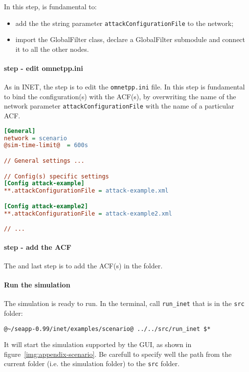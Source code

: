 In this step, is fundamental to:
%
\begin{itemize}
\item add the the string parameter \texttt{attackConfigurationFile} to the network;
\item import the GlobalFilter class, declare a GlobalFilter submodule and connect it to all the other nodes.
\end{itemize}

\paragraph{ step - edit omnetpp.ini}
As in INET, the  step is to edit the \texttt{omnetpp.ini} file. In this step is fundamental to bind the configuration(s) with the ACF(s), by overwriting the name of the network parameter \texttt{attackConfigurationFile} with the name of a particular ACF.
%
\begin{lstlisting}[language={ini}]
[General]
network = scenario
@sim-time-limit@  = 600s

// General settings ...

// Config(s) specific settings
[Config attack-example]
**.attackConfigurationFile = attack-example.xml

[Config attack-example2]
**.attackConfigurationFile = attack-example2.xml

// ...
\end{lstlisting}

\paragraph{ step - add the ACF}
The  and last step is to add the ACF(s) in the folder.

\paragraph{Run the simulation}
The simulation is ready to run. In the terminal, call \texttt{run\_inet} that is in the \texttt{src} folder:
%
\begin{lstlisting}[language={terminal}]
@~/seapp-0.99/inet/examples/scenario@ ../../src/run_inet $*
\end{lstlisting}
%
It will start the simulation supported by the GUI, as shown in figure~\ref{img:appendix-scenario}. Be carefull to specify well the path from the current folder (i.e. the simulation folder) to the \texttt{src} folder. 

